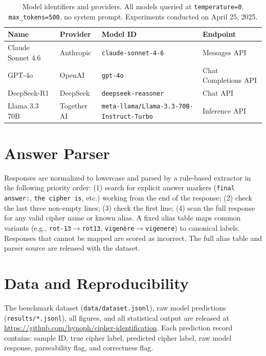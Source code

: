 \documentclass{article}
\begin{document}
\begin{table}[H]
\centering
\small
\begin{tabular}{llll}
\toprule
\textbf{Name} & \textbf{Provider} & \textbf{Model ID} & \textbf{Endpoint} \\
\midrule
Claude Sonnet 4.6 & Anthropic  & \texttt{claude-sonnet-4-6}                          & Messages API \\
GPT-4o            & OpenAI     & \texttt{gpt-4o}                                     & Chat Completions API \\
DeepSeek-R1       & DeepSeek   & \texttt{deepseek-reasoner}                          & Chat API \\
Llama 3.3 70B     & Together AI & \texttt{meta-llama/Llama-3.3-70B-Instruct-Turbo}   & Inference API \\
\bottomrule
\end{tabular}
\caption{Model identifiers and providers. All models queried at \texttt{temperature=0}, \texttt{max\_tokens=500}, no system prompt. Experiments conducted on April 25, 2025.}
\end{table}

\section{Answer Parser}
\label{app:parser}

Responses are normalized to lowercase and parsed by a rule-based extractor
in the following priority order:
(1) search for explicit answer markers (\texttt{final answer:}, \texttt{the cipher is}, etc.)
working from the end of the response;
(2) check the last three non-empty lines;
(3) check the first line;
(4) scan the full response for any valid cipher name or known alias.
A fixed alias table maps common variants (e.g., \texttt{rot-13}$\to$\texttt{rot13},
\texttt{vigen\`{e}re}$\to$\texttt{vigenere}) to canonical labels.
Responses that cannot be mapped are scored as incorrect.
The full alias table and parser source are released with the dataset.

\section{Data and Reproducibility}
\label{app:data}

The benchmark dataset (\texttt{data/dataset.jsonl}), raw model predictions
(\texttt{results/*.jsonl}), all figures, and all statistical output are
released at \url{https://github.com/hynoph/cipher-identification}.
Each prediction record contains: sample ID, true cipher label,
predicted cipher label, raw model response, parseability flag, and correctness flag.
\end{document}
